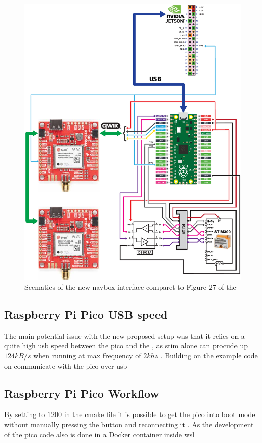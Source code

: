 \begin{figure}[H]
    \centering
    \includegraphics[width=\textwidth]{figures/navbox/navbox_usb.pdf}
    \caption{Scematics of the new \gls{navbox} interface comparet to Figure 27 of the \preproject}
    \label{fig:navbox_usb}
\end{figure}

\subsection{Raspberry Pi Pico USB speed}
The main potential issue with the new proposed setup was that it relies on a quite high \gls{usb} speed between the \gls{pico} and the \jx, as \gls{stim} alone can procude up $124kB/s$ when running at max frequency of $2khz$ \cite[34]{safranSTIM300Datasheet}.
Building on the example code on communicate with the \gls{pico} over \gls{usb}

\subsection{Raspberry Pi Pico Workflow}
By setting  to $1200$ in the \gls{cmake} file it is possible to get the \gls{pico} into boot mode without manually pressing the  button and reconnecting it \cite{hermannswAnswerSettingUsb2021}.
As the development of the \gls{pico} code also is done in a Docker container inside \gls{wsl}

